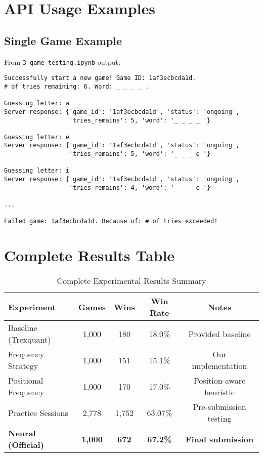 \documentclass[12pt,a4paper]{article}
\begin{document}
\section{API Usage Examples}

\subsection{Single Game Example}

From \texttt{3-game\_testing.ipynb} output:

\begin{verbatim}
Successfully start a new game! Game ID: 1af3ecbcda1d.
# of tries remaining: 6. Word: _ _ _ _ .

Guessing letter: a
Server response: {'game_id': '1af3ecbcda1d', 'status': 'ongoing',
                  'tries_remains': 5, 'word': '_ _ _ _ '}

Guessing letter: e
Server response: {'game_id': '1af3ecbcda1d', 'status': 'ongoing',
                  'tries_remains': 5, 'word': '_ _ _ e '}

Guessing letter: i
Server response: {'game_id': '1af3ecbcda1d', 'status': 'ongoing',
                  'tries_remains': 4, 'word': '_ _ _ e '}

...

Failed game: 1af3ecbcda1d. Because of: # of tries exceeded!
\end{verbatim}

\section{Complete Results Table}

\begin{table}[H]
\centering
\caption{Complete Experimental Results Summary}
\begin{tabular}{@{}lcccc@{}}
\toprule
\textbf{Experiment} & \textbf{Games} & \textbf{Wins} & \textbf{Win Rate} & \textbf{Notes} \\
\midrule
Baseline (Trexquant) & 1,000 & 180 & 18.0\% & Provided baseline \\
Frequency Strategy & 1,000 & 151 & 15.1\% & Our implementation \\
Positional Frequency & 1,000 & 170 & 17.0\% & Position-aware heuristic \\
Practice Sessions & 2,778 & 1,752 & 63.07\% & Pre-submission testing \\
\midrule
\textbf{Neural (Official)} & \textbf{1,000} & \textbf{672} & \textbf{67.2\%} & \textbf{Final submission} \\
\bottomrule
\end{tabular}
\end{table}
\end{document}
